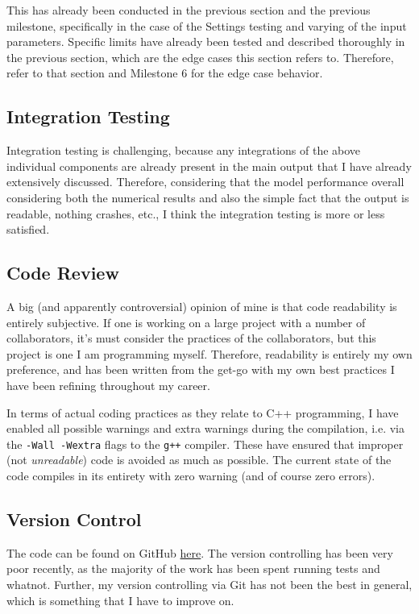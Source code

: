 This has already been conducted in the previous section and the previous milestone, specifically in the case of the Settings testing and varying of the input parameters. Specific limits have already been tested and described thoroughly in the previous section, which are the edge cases this section refers to. Therefore, refer to that section and Milestone 6 for the edge case behavior.



\subsection{Integration Testing}

Integration testing is challenging, because any integrations of the above individual components are already present in the main output that I have already extensively discussed. Therefore, considering that the model performance overall considering both the numerical results and also the simple fact that the output is readable, nothing crashes, etc., I think the integration testing is more or less satisfied.




\subsection{Code Review}

A big (and apparently controversial) opinion of mine is that code readability is entirely subjective. If one is working on a large project with a number of collaborators, it's must consider the practices of the collaborators, but this project is one I am programming myself. Therefore, readability is entirely my own preference, and has been written from the get-go with my own best practices I have been refining throughout my career.

In terms of actual coding practices as they relate to C++ programming, I have enabled all possible warnings and extra warnings during the compilation, i.e. via the \texttt{-Wall -Wextra} flags to the \texttt{g++} compiler. These have ensured that improper (not \textit{unreadable}) code is avoided as much as possible. The current state of the code compiles in its entirety with zero warning (and of course zero errors).


\subsection{Version Control}

The code can be found on GitHub \href{https://github.com/champso1/ColSim}{here}. The version controlling has been very poor recently, as the majority of the work has been spent running tests and whatnot. Further, my version controlling via Git has not been the best in general, which is something that I have to improve on. 









